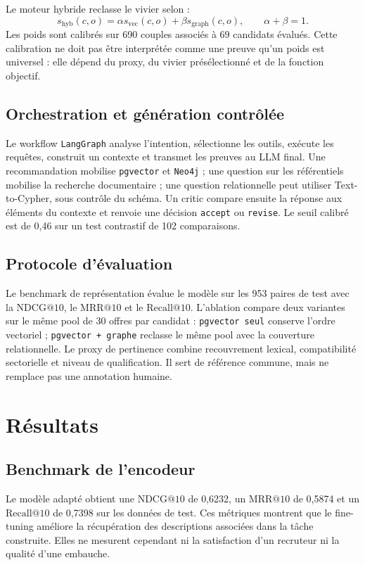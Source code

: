 \documentclass[10pt]{article}
\makeatletter
\newcommand{\pgvector}{\texttt{pgvector}}
\newcommand{\neo}{\texttt{Neo4j}}
\newcommand{\langgraph}{\texttt{LangGraph}}
\newcommand{\ndcg}{\ensuremath{\mathrm{NDCG@10}}}
\newcommand{\mrr}{\ensuremath{\mathrm{MRR@10}}}
\newcommand{\recall}{\ensuremath{\mathrm{Recall@10}}}
\makeatother
\begin{document}
Le moteur hybride reclasse le vivier selon :
\begin{equation}
 s_{\mathrm{hyb}}(c,o)=\alpha s_{\mathrm{vec}}(c,o)+\beta s_{\mathrm{graph}}(c,o),\qquad \alpha+\beta=1.
\end{equation}
Les poids sont calibrés sur 690 couples associés à 69 candidats évalués. Cette calibration ne doit pas être interprétée comme une preuve qu'un poids est universel : elle dépend du proxy, du vivier présélectionné et de la fonction objectif.

\subsection{Orchestration et génération contrôlée}
Le workflow \langgraph{} analyse l'intention, sélectionne les outils, exécute les requêtes, construit un contexte et transmet les preuves au LLM final. Une recommandation mobilise \pgvector{} et \neo{} ; une question sur les référentiels mobilise la recherche documentaire ; une question relationnelle peut utiliser Text-to-Cypher, sous contrôle du schéma. Un critic compare ensuite la réponse aux éléments du contexte et renvoie une décision \texttt{accept} ou \texttt{revise}. Le seuil calibré est de 0,46 sur un test contrastif de 102 comparaisons.

\subsection{Protocole d'évaluation}
Le benchmark de représentation évalue le modèle sur les 953 paires de test avec la \ndcg{}, le \mrr{} et le \recall{}. L'ablation compare deux variantes sur le même pool de 30 offres par candidat : \texttt{pgvector seul} conserve l'ordre vectoriel ; \texttt{pgvector + graphe} reclasse le même pool avec la couverture relationnelle. Le proxy de pertinence combine recouvrement lexical, compatibilité sectorielle et niveau de qualification. Il sert de référence commune, mais ne remplace pas une annotation humaine.

\section{Résultats}
\subsection{Benchmark de l'encodeur}
Le modèle adapté obtient une \ndcg{} de 0,6232, un \mrr{} de 0,5874 et un \recall{} de 0,7398 sur les données de test. Ces métriques montrent que le fine-tuning améliore la récupération des descriptions associées dans la tâche construite. Elles ne mesurent cependant ni la satisfaction d'un recruteur ni la qualité d'une embauche.
\end{document}
